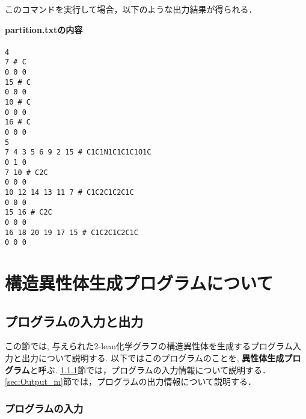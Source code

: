 \documentclass[11pt,titlepage,dvipdfmx,twoside]{jarticle}
\begin{document}
このコマンドを実行して場合，以下のような出力結果が得られる．

\begin{oframed}
{\bf partition.txtの内容}\\\\
{\tt 4 \\
7 \# C \\
0 0 0 \\
15 \# C \\
0 0 0 \\
10 \# C \\
0 0 0 \\
16 \# C \\
0 0 0 \\
5 \\
7 4 3 5 6 9 2 15 \# C1C1N1C1C1C1O1C \\
0 1 0 \\
7 10 \# C2C \\
0 0 0 \\
10 12 14 13 11 7 \# C1C2C1C2C1C \\
0 0 0 \\
15 16 \# C2C \\
0 0 0 \\
16 18 20 19 17 15 \# C1C2C1C2C1C \\
0 0 0 \\}
\end{oframed}

\section{構造異性体生成プログラムについて}
\label{sec: main}

\subsection{プログラムの入力と出力}
\label{sec:InOut_m}

この節では, 与えられた2-lean化学グラフの構造異性体を生成するプログラム入力と出力について説明する.
以下ではこのプログラムのことを, {\bf 異性体生成プログラム}と呼ぶ.
\ref{sec:Input_m}節では，プログラムの入力情報について説明する．
\ref{sec:Output_m}節では，プログラムの出力情報について説明する．

\subsubsection{プログラムの入力}
\label{sec:Input_m}
\end{document}
